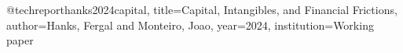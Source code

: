 @techreport{hanks2024capital,
  title={Capital, Intangibles, and Financial Frictions},
  author={Hanks, Fergal and Monteiro, Joao},
  year={2024},
  institution={Working paper}
}